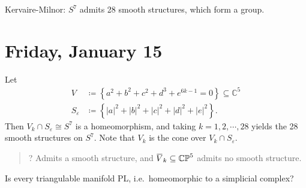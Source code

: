 \begin{remark}

Kervaire-Milnor: \(S^7\) admits 28 smooth structures, which form a
group.

\end{remark}

\hypertarget{friday-january-15}{%
\section{Friday, January 15}\label{friday-january-15}}

\begin{remark}

Let
\begin{align*}
V &\coloneqq\left\{{a^2 + b^2 + c^2 + d^3 + e^{6k-1} = 0}\right\} \subseteq {\mathbb{C}}^5 \\
S_\varepsilon&\coloneqq\left\{{ {\left\lvert {a} \right\rvert}^2 + {\left\lvert {b} \right\rvert}^2 + {\left\lvert {c} \right\rvert}^2 + {\left\lvert {d} \right\rvert}^2 + {\left\lvert {e} \right\rvert}^2}\right\}
.\end{align*}
Then \(V_k \cap S_\varepsilon\cong S^7\) is a homeomorphism, and taking
\(k=1,2,\cdots, 28\) yields the 28 smooth structures on \(S^7\). Note
that \(V_k\) is the cone over \(V_k \cap S_\varepsilon\).

\begin{figure}
\centering
{}
\end{figure}

\begin{quote}
? Admits a smooth structure, and
\(\mkern 1.5mu\overline{\mkern-1.5muV\mkern-1.5mu}\mkern 1.5mu_k \subseteq {\mathbb{CP}}^5\)
admits no smooth structure.
\end{quote}

\end{remark}

\begin{question}

Is every triangulable manifold PL, i.e.~homeomorphic to a simplicial
complex?

\end{question}

